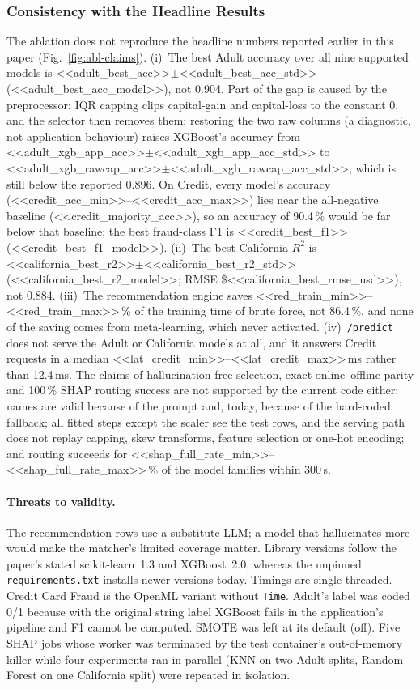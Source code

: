 \subsubsection{Consistency with the Headline Results}
The ablation does not reproduce the headline numbers reported earlier in this paper (Fig.~\ref{fig:abl-claims}). (i)~The best Adult accuracy over all nine supported models is <<adult_best_acc>>$\pm$<<adult_best_acc_std>> (<<adult_best_acc_model>>), not 0.904. Part of the gap is caused by the preprocessor: IQR capping clips capital-gain and capital-loss to the constant 0, and the selector then removes them; restoring the two raw columns (a diagnostic, not application behaviour) raises XGBoost's accuracy from <<adult_xgb_app_acc>>$\pm$<<adult_xgb_app_acc_std>> to <<adult_xgb_rawcap_acc>>$\pm$<<adult_xgb_rawcap_acc_std>>, which is still below the reported 0.896. On Credit, every model's accuracy (<<credit_acc_min>>--<<credit_acc_max>>) lies near the all-negative baseline (<<credit_majority_acc>>), so an accuracy of 90.4\,\% would be far below that baseline; the best fraud-class F1 is <<credit_best_f1>> (<<credit_best_f1_model>>). (ii)~The best California $R^2$ is <<california_best_r2>>$\pm$<<california_best_r2_std>> (<<california_best_r2_model>>; RMSE \$<<california_best_rmse_usd>>), not 0.884. (iii)~The recommendation engine saves <<red_train_min>>--<<red_train_max>>\,\% of the training time of brute force, not 86.4\,\%, and none of the saving comes from meta-learning, which never activated. (iv)~\texttt{/predict} does not serve the Adult or California models at all, and it answers Credit requests in a median <<lat_credit_min>>--<<lat_credit_max>>\,ms rather than 12.4\,ms. The claims of hallucination-free selection, exact online--offline parity and 100\,\% SHAP routing success are not supported by the current code either: names are valid because of the prompt and, today, because of the hard-coded fallback; all fitted steps except the scaler see the test rows, and the serving path does not replay capping, skew transforms, feature selection or one-hot encoding; and routing succeeds for <<shap_full_rate_min>>--<<shap_full_rate_max>>\,\% of the model families within 300\,s.

\paragraph{Threats to validity.} The recommendation rows use a substitute LLM; a model that hallucinates more would make the matcher's limited coverage matter. Library versions follow the paper's stated scikit-learn~1.3 and XGBoost~2.0, whereas the unpinned \texttt{requirements.txt} installs newer versions today. Timings are single-threaded. Credit Card Fraud is the OpenML variant without \texttt{Time}. Adult's label was coded 0/1 because with the original string label XGBoost fails in the application's pipeline and F1 cannot be computed. SMOTE was left at its default (off). Five SHAP jobs whose worker was terminated by the test container's out-of-memory killer while four experiments ran in parallel (KNN on two Adult splits, Random Forest on one California split) were repeated in isolation.
\endgroup
